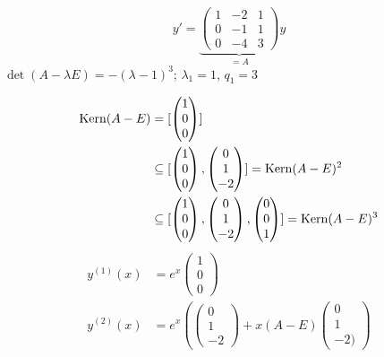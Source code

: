 \documentclass{article}
\begin{document}
\begin{beispiele}
\item

\[y' = \underbrace{
\begin{pmatrix}
1  & -2 & 1 \\
0 & -1 & 1 \\
0 & -4 & 3 
\end{pmatrix}}_{=A}y
\]
$\det(A-\lambda E) = -(\lambda-1)^3$; $\lambda_1 = 1$, $q_1=3$

\begin{align*}
\mathop{\rm Kern}\nolimits(A-E) &= [
\begin{pmatrix}
1\\0\\0
\end{pmatrix}]\\
&\subseteq [
\begin{pmatrix}
1\\0\\0
\end{pmatrix},
\begin{pmatrix}
0\\1\\-2
\end{pmatrix}] = \mathop{\rm Kern}\nolimits(A-E)^2\\
&\subseteq [
\begin{pmatrix}
1\\0\\0
\end{pmatrix},
\begin{pmatrix}
0\\1\\-2
\end{pmatrix},
\begin{pmatrix}
0\\0\\1
\end{pmatrix}
] = \mathop{\rm Kern}\nolimits(A-E)^3
\end{align*}
\begin{align*}
y^{(1)}(x) &= e^x
\begin{pmatrix}
1\\0\\0
\end{pmatrix}\\
y^{(2)}(x) &= e^x \left(
\begin{pmatrix}
0\\1\\-2
\end{pmatrix} + x(A-E)
\begin{pmatrix}
0\\1\\-2)

\end{pmatrix}
\end{align*}
\end{beispiele}
\end{document}
